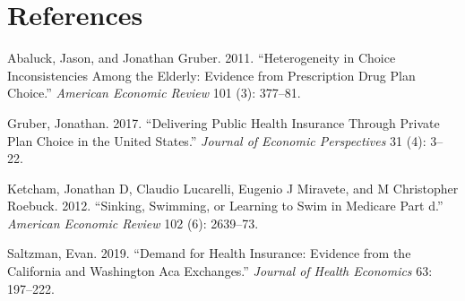 \documentclass[12pt,]{article}
\begin{document}
\hypertarget{references}{%
\section*{References}\label{references}}

\hypertarget{refs}{}
\leavevmode\hypertarget{ref-abaluck2011}{}%
Abaluck, Jason, and Jonathan Gruber. 2011. ``Heterogeneity in Choice
Inconsistencies Among the Elderly: Evidence from Prescription Drug Plan
Choice.'' \emph{American Economic Review} 101 (3): 377--81.

\leavevmode\hypertarget{ref-gruber2017}{}%
Gruber, Jonathan. 2017. ``Delivering Public Health Insurance Through
Private Plan Choice in the United States.'' \emph{Journal of Economic
Perspectives} 31 (4): 3--22.

\leavevmode\hypertarget{ref-ketcham2012}{}%
Ketcham, Jonathan D, Claudio Lucarelli, Eugenio J Miravete, and M
Christopher Roebuck. 2012. ``Sinking, Swimming, or Learning to Swim in
Medicare Part d.'' \emph{American Economic Review} 102 (6): 2639--73.

\leavevmode\hypertarget{ref-saltzman2019}{}%
Saltzman, Evan. 2019. ``Demand for Health Insurance: Evidence from the
California and Washington Aca Exchanges.'' \emph{Journal of Health
Economics} 63: 197--222.
\end{document}
